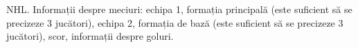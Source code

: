 NHL. Informații despre meciuri: echipa 1, formația principală (este suficient să se precizeze 3 jucători), echipa 2, formația de bază (este suficient să se precizeze 3 jucători), scor, informații despre goluri.
